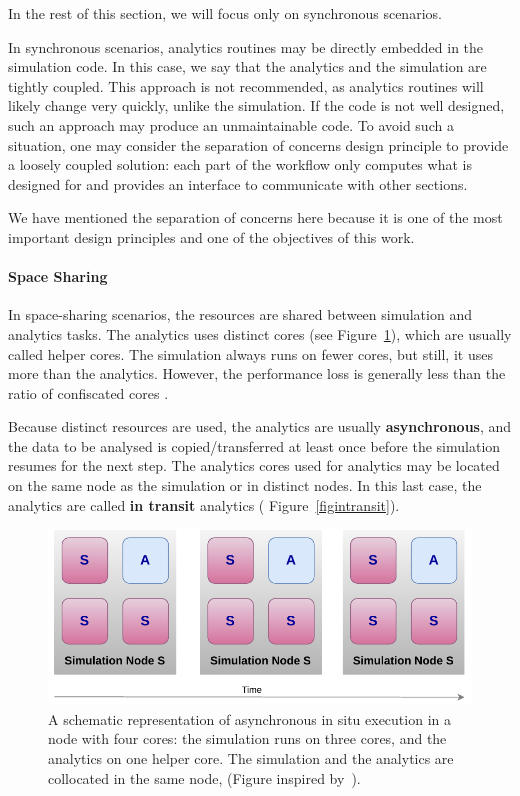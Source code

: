 \begin{itemize}
    In the rest of this section, we will focus only on synchronous scenarios.
    
\end{itemize}

In synchronous scenarios, analytics routines may be directly embedded in the simulation code. In this case, we say that the analytics and the simulation are tightly coupled. This approach is not recommended, as analytics routines will likely change very quickly, unlike the simulation. If the code is not well designed, such an approach may produce an unmaintainable code.
To avoid such a situation, one may consider the separation of concerns design principle to provide a loosely coupled solution: each part of the workflow only computes what is designed for and provides an interface to communicate with other sections.

We have mentioned the separation of concerns here because it is one of the most important design principles and one of the objectives of this work.

\paragraph{Space Sharing}\label{sec:spacesharing}
In space-sharing scenarios, the resources are shared between simulation and analytics tasks. The analytics uses distinct cores (see Figure~\ref{figinsituhelper}), which are usually called helper cores. The simulation always runs on fewer cores, but still, it uses more than the analytics. However, the performance loss is generally less than the ratio of confiscated cores \cite{zheng2013goldrush, dorier_damaris_2012, Estelle_integration_2018}.

Because distinct resources are used, the analytics are usually \textbf{asynchronous}, and the data to be analysed is copied/transferred  at least once before the simulation resumes for the next step. The analytics cores used for analytics may be located on the same node as the simulation or in distinct nodes. In this last case, the analytics are called \textbf{in transit} analytics ( Figure~\ref{figintransit}). 
\begin{figure}[tb]\centering
\includegraphics[scale=0.9]{figures/insitu_helpercore.pdf}
\caption{A schematic representation of asynchronous in situ execution in a node with four cores: the simulation runs on three cores, and the analytics on one helper core. The simulation and the analytics are collocated in the same node, (Figure inspired by~\cite{Estelle_integration_2018}).}
\label{figinsituhelper}
\end{figure}

